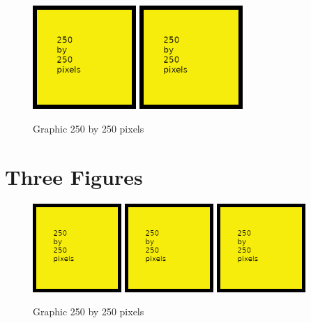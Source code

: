 \begin{figure}[H]
\centering
\includegraphics[width=0.35\textwidth]{250x250}
\includegraphics[width=0.35\textwidth]{250x250}
\caption{Graphic 250 by 250 pixels}\label{fg:250x250-3}
\end{figure}

\section{Three Figures}

\begin{figure}[H]
\centering
\includegraphics[width=0.3\textwidth]{250x250}
\includegraphics[width=0.3\textwidth]{250x250}
\includegraphics[width=0.3\textwidth]{250x250}
\caption{Graphic 250 by 250 pixels}\label{fg:250x250-4}
\end{figure}

